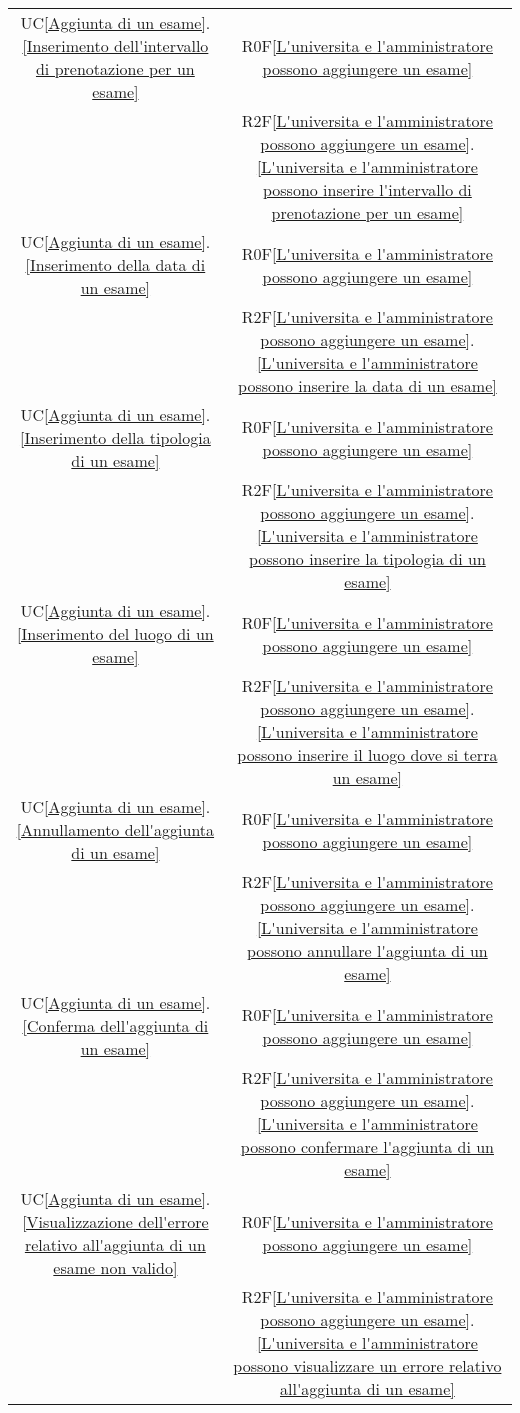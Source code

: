\begin{longtable}{|c|c|}
\hline
UC\ref{Aggiunta di un esame}.\ref{Inserimento dell'intervallo di prenotazione per un esame} & R0F\ref{L'universita e l'amministratore possono aggiungere un esame}\\
& R2F\ref{L'universita e l'amministratore possono aggiungere un esame}.\ref{L'universita e l'amministratore possono inserire l'intervallo di prenotazione per un esame}\\
\hline
UC\ref{Aggiunta di un esame}.\ref{Inserimento della data di un esame} & R0F\ref{L'universita e l'amministratore possono aggiungere un esame}\\
& R2F\ref{L'universita e l'amministratore possono aggiungere un esame}.\ref{L'universita e l'amministratore possono inserire la data di un esame}\\
\hline
UC\ref{Aggiunta di un esame}.\ref{Inserimento della tipologia di un esame} & R0F\ref{L'universita e l'amministratore possono aggiungere un esame}\\
& R2F\ref{L'universita e l'amministratore possono aggiungere un esame}.\ref{L'universita e l'amministratore possono inserire la tipologia di un esame}\\
\hline
UC\ref{Aggiunta di un esame}.\ref{Inserimento del luogo di un esame} & R0F\ref{L'universita e l'amministratore possono aggiungere un esame}\\
& R2F\ref{L'universita e l'amministratore possono aggiungere un esame}.\ref{L'universita e l'amministratore possono inserire il luogo dove si terra un esame}\\
\hline
UC\ref{Aggiunta di un esame}.\ref{Annullamento dell'aggiunta di un esame} & R0F\ref{L'universita e l'amministratore possono aggiungere un esame}\\
& R2F\ref{L'universita e l'amministratore possono aggiungere un esame}.\ref{L'universita e l'amministratore possono annullare l'aggiunta di un esame}\\
\hline
UC\ref{Aggiunta di un esame}.\ref{Conferma dell'aggiunta di un esame} & R0F\ref{L'universita e l'amministratore possono aggiungere un esame}\\
& R2F\ref{L'universita e l'amministratore possono aggiungere un esame}.\ref{L'universita e l'amministratore possono confermare l'aggiunta di un esame}\\
\hline
UC\ref{Aggiunta di un esame}.\ref{Visualizzazione dell'errore relativo all'aggiunta di un esame non valido} & R0F\ref{L'universita e l'amministratore possono aggiungere un esame}\\
& R2F\ref{L'universita e l'amministratore possono aggiungere un esame}.\ref{L'universita e l'amministratore possono visualizzare un errore relativo all'aggiunta di un esame}\\

\end{longtable}
